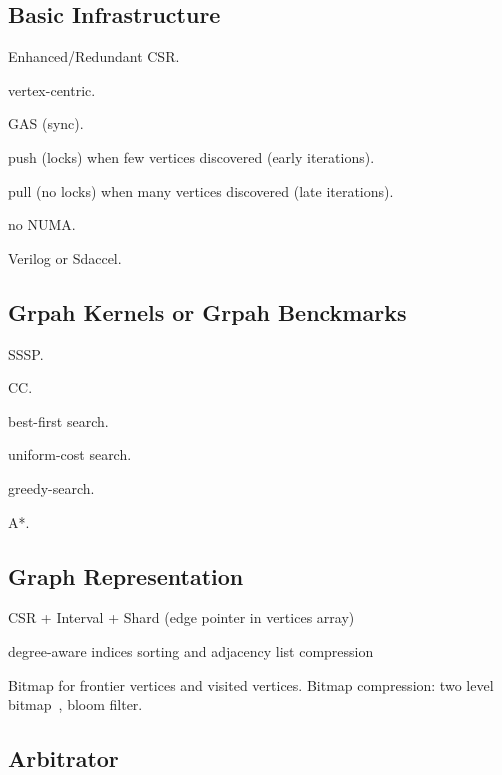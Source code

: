 \documentclass[UTF8,12pt,a4paper]{article}
\begin{document}
\subsection{Basic Infrastructure}
\begin{compactitem}
  \item Enhanced/Redundant CSR.
  \item vertex-centric.
  \item GAS (sync).
  \item push (locks) when few vertices discovered (early iterations).
  \item pull (no locks) when many vertices discovered (late iterations).
  \item no NUMA.
  \item Verilog or Sdaccel.
\end{compactitem}

\subsection{Grpah Kernels or Grpah Benckmarks}
\begin{compactitem}
  \item SSSP.
  \item CC.
  \item best-first search.
  \item uniform-cost search.
  \item greedy-search.
  \item A*.
\end{compactitem}

\subsection{Graph Representation}
\begin{compactitem}
  \item CSR + Interval + Shard (edge pointer in vertices array)~\cite{DBLP:conf/sbac-pad/ZhouP17}
  \item degree-aware indices sorting and adjacency list compression~\cite{DBLP:conf/fpga/ZhangL18}
  \item Bitmap for frontier vertices and visited vertices.
  Bitmap compression: two level bitmap~\cite{DBLP:conf/fpga/ZhangL18},
  bloom filter.
\end{compactitem}

\subsection{Arbitrator} %
\label{sub:arbitrator}
\end{document}
